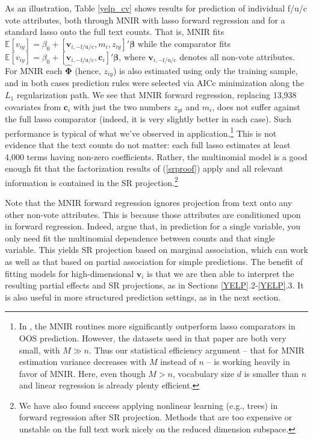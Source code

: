 \documentclass[12pt]{article}
\newcommand{\bs}[1]{\boldsymbol{#1}}
\newcommand{\bm}[1]{\mathbf{#1}}
\newcommand{\ds}[1]{\mathds{#1}}
\begin{document}
As an illustration, Table \ref{yelp_cv} shows results for prediction of
individual f/u/c vote attributes, both through MNIR with lasso forward regression
and for a standard lasso onto the full text counts.  That is, MNIR fits
$\ds{E}[v_{iy}] = \beta_0 +
[\bm{v}_{i,-{\text{f/u/c}}},m_i,z_{iy}]'\bs{\beta}$ while the comparator fits
$\ds{E}[v_{iy}] = \beta_0 + [\bm{v}_{i,-{\text{f/u/c}}},\bm{c}_i]'\bs{\beta}$,
where $\bm{v}_{i,-{\text{f/u/c}}}$  denotes all non-vote attributes.  For MNIR
each $\bs{\hat \Phi}$ (hence, $z_{iy}$) is also  estimated using only the
training sample, and  in both cases prediction rules were selected via AICc
minimization along the $L_1$ regularization path. We see  that
MNIR forward regression, replacing 13,938 covariates from $\bm{c}_i$ with just
the two numbers $z_{yi}$ and $m_i$, does not suffer against the full lasso
comparator (indeed, it is very slightly better in each case). Such performance
is  typical of what we've observed in application.\footnote{In
\cite{taddy_multinomial_2013}, the MNIR routines more significantly outperform
lasso comparators in OOS prediction. However, the datasets used in that paper
are both very small, with $M\gg n$. Thus our statistical efficiency argument
-- that for MNIR estimation variance decreases with $M$ instead of $n$ -- is
   working heavily in favor of MNIR. Here, even though $M > n$,  vocabulary
   size $d$ is smaller than $n$ and linear regression is already plenty
   efficient.} This is not evidence that the text counts do not matter: each
   full lasso estimates at least 4,000 terms having non-zero coefficients.
   Rather, the multinomial model is a good enough fit that the factorization
   results of (\ref{srproof}) apply and all relevant information is contained
   in the SR projection.\footnote{We have also found success applying
   nonlinear learning (e.g., trees) in forward regression after SR projection.
   Methods that are too expensive or unstable on the full text work nicely on
   the reduced dimension subspace.}


Note that the MNIR forward regression ignores projection from text onto any
other non-vote attributes. This is because those attributes are conditioned
upon in forward regression.  Indeed,
\cite{taddy_multinomial_2013,taddy_rejoinder:_2013} argue that, in prediction
for a single variable, you only need fit the multinomial dependence between
counts and that single variable.  This yields SR projection based on marginal
association, which can work as well as that based on partial
association for simple predictions. The benefit of fitting models for
high-dimensional $\bm{v}_i$ is that we are then able to interpret the resulting
partial effects and SR projections, as in Sections
\ref{YELP}.2-\ref{YELP}.3.  It is also useful in more structured prediction
settings, as in the next section.
\end{document}
